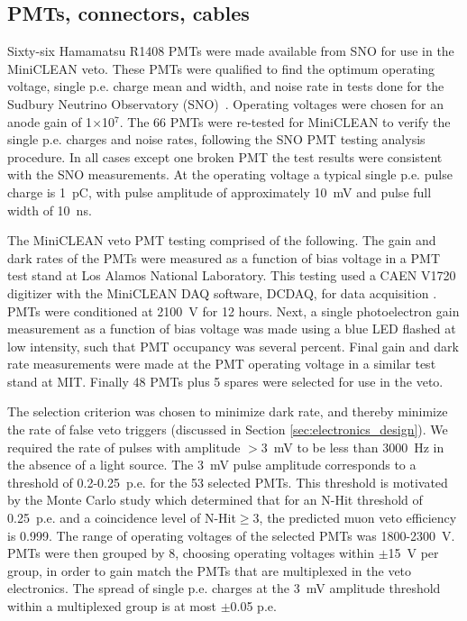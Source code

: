 \documentclass[review,number,sort&compress]{elsarticle}
\begin{document}
\subsection{PMTs, connectors, cables}
\label{sec:pmts}
%
Sixty-six Hamamatsu R1408 PMTs were made available from SNO for use in the
MiniCLEAN veto. These PMTs were qualified to find the optimum
operating voltage, single p.e. charge mean and width, and noise rate in
tests done for the Sudbury Neutrino Observatory
(SNO)~\cite{ref:sno_pmt_paper}.  Operating voltages were chosen for an
anode gain of 1$\times$10$^7$.  The 66 PMTs were re-tested for
MiniCLEAN to verify the single p.e. charges and noise rates, following
the SNO PMT testing analysis procedure.  In all cases except one
broken PMT the test results were consistent with the SNO measurements.
At the operating voltage a typical single p.e. pulse charge is 1~pC,
with pulse amplitude of approximately 10~mV and pulse full width of
10~ns.

The MiniCLEAN veto PMT testing comprised of the following.  The gain and
dark rates of the PMTs were measured as a function of bias voltage
in a PMT test stand at Los Alamos National Laboratory.  This testing used a CAEN
V1720 digitizer with the MiniCLEAN DAQ software, DCDAQ, for data
acquisition \cite{ref:gastler_thesis}. PMTs were conditioned at 2100~V
for 12 hours. Next, a single photoelectron gain measurement as a
function of bias voltage was made using a blue LED flashed at low
intensity, such that PMT occupancy was several percent. Final gain and
dark rate measurements were made at the PMT operating voltage in a
similar test stand at MIT. Finally 48 PMTs plus 5 spares were selected for
use in the veto. 

The selection criterion was chosen to minimize dark rate, and thereby
minimize the rate of false veto triggers (discussed in Section
\ref{sec:electronics_design}).  We required the rate of pulses with
amplitude $>$3~mV to be less than 3000~Hz in the absence of a light
source.  The 3~mV pulse amplitude corresponds to a threshold of
0.2-0.25~p.e. for the 53 selected PMTs.  This threshold is motivated
by the Monte Carlo study which determined that for an N-Hit threshold
of 0.25~p.e. and a coincidence level of N-Hit$\ge$3, the predicted
muon veto efficiency is 0.999.  The range of operating voltages of the
selected PMTs was 1800-2300~V.  PMTs were then grouped by 8, choosing
operating voltages within $\pm$15~V per group, in order to gain match
the PMTs that are multiplexed in the veto electronics.  The spread of
single p.e. charges at the 3~mV amplitude threshold within a
multiplexed group is at most $\pm$0.05 p.e.
\end{document}
